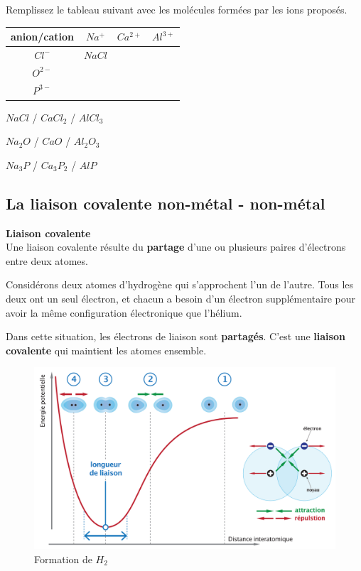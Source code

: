 \documentclass[
  11pt,
  a4paper,
  openany]{book}
\begin{document}
\begin{Exercise}
Remplissez le tableau suivant avec les molécules formées par les ions proposés.

\end{Exercise}

\begin{longtable}[]{@{}cccc@{}}
\toprule()
anion/cation & \(Na^+\) & \(Ca^{2+}\) & \(Al^{3+}\) \\
\midrule()
\endhead
\(Cl^{-}\) & \(NaCl\) & & \\
\(O^{2-}\) & & & \\
\(P^{3-}\) & & & \\
\bottomrule()
\end{longtable}

\begin{Answer}
\(NaCl\) / \(CaCl_2\) / \(AlCl_3\)

\(Na_2O\) / \(CaO\) / \(Al_2O_3\)

\(Na_3P\) / \(Ca_3P_2\) / \(AlP\)

\end{Answer}

\newpage

\hypertarget{la-liaison-covalente-non-muxe9tal---non-muxe9tal}{%
\subsection{La liaison covalente \textbar{} non-métal - non-métal}\label{la-liaison-covalente-non-muxe9tal---non-muxe9tal}}

\begin{tcolorbox}
\textbf{Liaison covalente}\\
Une liaison covalente résulte du \textbf{partage} d'une ou plusieurs paires d'électrons entre deux atomes.

\end{tcolorbox}

Considérons deux atomes d'hydrogène qui s'approchent l'un de l'autre. Tous les deux ont un seul électron, et chacun a besoin d'un électron supplémentaire pour avoir la même configuration électronique que l'hélium.

Dans cette situation, les électrons de liaison sont \textbf{partagés}. C'est une \textbf{liaison covalente} qui maintient les atomes ensemble.

\begin{figure}

{\centering \includegraphics[width=0.5\linewidth]{images/H2-bond} 

}

\caption{Formation de $H_2$}\label{fig:H2-bond}
\end{figure}
\end{document}
